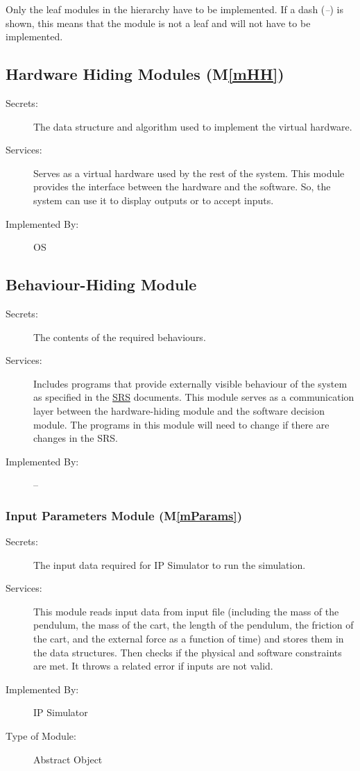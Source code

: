 \documentclass[12pt, titlepage]{article}
\newcommand{\mref}[1]{M\ref{#1}}
\begin{document}
Only the leaf modules in the hierarchy have to be implemented. If a dash
(\emph{--}) is shown, this means that the module is not a leaf and will not have to be implemented.

\subsection{Hardware Hiding Modules (\mref{mHH})}

\begin{description}
\item[Secrets:]The data structure and algorithm used to implement the virtual hardware.
\item[Services:]Serves as a virtual hardware used by the rest of the
  system. This module provides the interface between the hardware and the
  software. So, the system can use it to display outputs or to accept inputs.
\item[Implemented By:] OS
\end{description}

\subsection{Behaviour-Hiding Module}

\begin{description}
\item[Secrets:] The contents of the required behaviours.
\item[Services:] Includes programs that provide externally visible behaviour of
  the system as specified in the \href{https://github.com/MinMah23/CAS741-Project/tree/main/docs/SRS}{SRS}
  documents. This module serves as a communication layer between the
  hardware-hiding module and the software decision module. The programs in this
  module will need to change if there are changes in the SRS.
\item[Implemented By:] --
\end{description}

\subsubsection{Input Parameters Module (\mref{mParams})}

\begin{description}
\item[Secrets:] The input data required for IP Simulator to run the simulation.

\item[Services:]This module reads input data from input file (including the mass of the pendulum, the mass of the cart, the length of the pendulum, the friction of the cart, and the external force as a function of time) and stores them in the data structures. Then checks if the physical and software constraints are met. It throws a related error if inputs are not valid.
\item[Implemented By:] IP Simulator
\item[Type of Module:] Abstract Object
\end{description}
\end{document}
